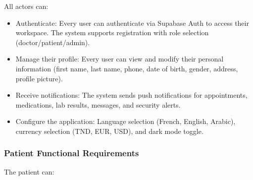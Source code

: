 \documentclass[12pt,a4paper,oneside]{report}
\begin{document}
All actors can:

\begin{itemize}
    \item Authenticate: Every user can authenticate via Supabase Auth to access their workspace. The system supports registration with role selection (doctor/patient/admin).
    \item Manage their profile: Every user can view and modify their personal information (first name, last name, phone, date of birth, gender, address, profile picture).
    \item Receive notifications: The system sends push notifications for appointments, medications, lab results, messages, and security alerts.
    \item Configure the application: Language selection (French, English, Arabic), currency selection (TND, EUR, USD), and dark mode toggle.
\end{itemize}

\subsubsection{Patient Functional Requirements}

The patient can:
\end{document}
